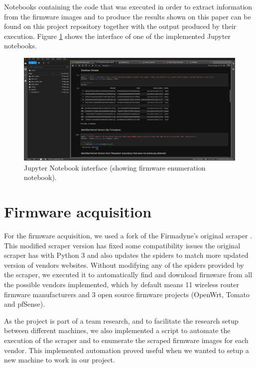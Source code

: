 Notebooks containing the code that was executed in order to extract information from the firmware images and to produce the results shown on this paper can be found on this project repository \cite{github:c2dc-toso} together with the output produced by their execution. Figure \ref{fig:jupyter} shows the interface of one of the implemented Jupyter notebooks.

\begin{figure}[H]
    \centering
    \includegraphics[width=1.0\textwidth]{figs/jupyter.png}
    \caption{Jupyter Notebook interface (showing firmware enumeration notebook).}
    \label{fig:jupyter}
\end{figure}

\section{Firmware acquisition}
\label{sec:firmware-aquisition}

For the firmware acquisition, we used a fork of the Firmadyne's \cite{firmadyne} original scraper \cite{github:scraper}. This modified scraper version has fixed some compatibility issues the original scraper has with Python 3 and also updates the spiders to match more updated version of vendors websites. Without modifying any of the spiders provided by the scraper, we executed it to automatically find and download firmware from all the possible vendors implemented, which by default means 11 wireless router firmware manufacturers and 3 open source firmware projects (OpenWrt, Tomato and pfSense).

As the project is part of a team research, and to facilitate the research setup between different machines, we also implemented a script to automate the execution of the scraper and to enumerate the scraped firmware images for each vendor. This implemented automation proved useful when we wanted to setup a new machine to work in our project.

